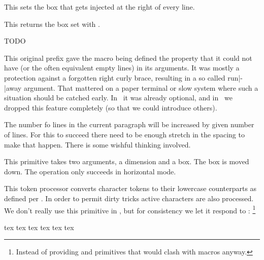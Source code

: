 \startnewprimitive[title={\prm {localrightbox}}]

This sets the box that gets injected at the right of every line.

\stopnewprimitive

\startnewprimitive[title={\prm {localrightboxbox}}]

This returns the box set with .

\stopnewprimitive

\startnewprimitive[title={\prm {localtolerance}}]
    TODO
\stopnewprimitive

\startoldprimitive[title={\prm {long}}][obsolete=yes]

This original prefix gave the macro being defined the property that it could not
have  (or the often equivalent empty lines) in its arguments. It was
mostly a protection against a forgotten right curly brace, resulting in a so called
run|-|away argument. That mattered on a paper terminal or slow system where such a
situation should be catched early. In \LUATEX\ it was already optional, and in
\LUAMETATEX\ we dropped this feature completely (so that we could introduce others).

\stopoldprimitive

\startoldprimitive[title={\prm {looseness}}]

The number fo lines in the current paragraph will be increased by given number of
lines. For this to succeed there need to be enough stretch in the spacing to make
that happen. There is some wishful thinking involved.

\stopoldprimitive

\startoldprimitive[title={\prm {lower}}]

This primitive takes two arguments, a dimension and a box. The box is moved down.
The operation only succeeds in horizontal mode.

\stopoldprimitive

\startoldprimitive[title={\prm {lowercase}}]

This token processor converts character tokens to their lowercase counterparts as
defined per . In order to permit dirty tricks active characters are
also processed. We don't really use this primitive in \CONTEXT, but for
consistency we let it respond to : \footnote {Instead of providing
\type {\lowercased} and \type {\uppercased} primitives that would clash with
macros anyway.}

\startbuffer
\edef           \foo       {\lowercase{tex TeX \TEX}} \meaningless\foo
\lowercase{\edef\foo                  {tex TeX \TEX}} \meaningless\foo
\edef           \foo{\expand\lowercase{tex TeX \TEX}} \meaningless\foo
\stopbuffer

